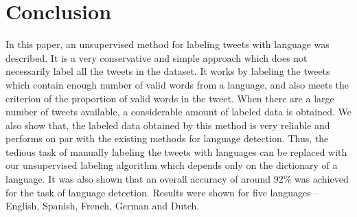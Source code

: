 \documentclass[11pt]{article}
\begin{document}
\section{Conclusion}
In this paper, an unsupervised method for labeling tweets with language was described. It is a very conservative and simple approach which does not necessarily label all the tweets in the dataset. It works by labeling the tweets which contain enough number of valid words from a language, and also meets the criterion of the proportion of valid words in the tweet. When there are a large number of tweets available, a considerable amount of labeled data is obtained. We also show that, the labeled data obtained by this method is very reliable and performs on par with the existing methods for language detection. Thus, the tedious task of manually labeling the tweets with languages can be replaced with our unsupervised labeling algorithm which depends only on the dictionary of a language. It was also shown that an overall accuracy of around 92\% was achieved for the task of language detection. Results were shown for five languages -- English, Spanish, French, German and Dutch.
\end{document}
